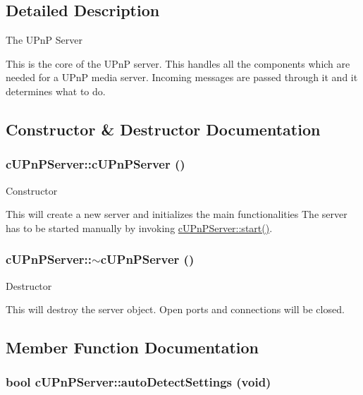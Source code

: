 \subsection{Detailed Description}
The UPnP Server

This is the core of the UPnP server. This handles all the components which are needed for a UPnP media server. Incoming messages are passed through it and it determines what to do. 

\subsection{Constructor \& Destructor Documentation}
\hypertarget{classcUPnPServer_e0277b2231f10e66a5c6ce9acb42fcd0}{
\subsubsection[{cUPnPServer}]{\setlength{\rightskip}{0pt plus 5cm}cUPnPServer::cUPnPServer ()}}
\label{classcUPnPServer_e0277b2231f10e66a5c6ce9acb42fcd0}


Constructor

This will create a new server and initializes the main functionalities The server has to be started manually by invoking \hyperlink{classcUPnPServer_811d90c5aadc75bc48670757def1c21e}{cUPnPServer::start()}. \hypertarget{classcUPnPServer_8eb136050f3f6c2edb7acbf5d690723d}{
\subsubsection[{$\sim$cUPnPServer}]{\setlength{\rightskip}{0pt plus 5cm}cUPnPServer::$\sim$cUPnPServer ()}}
\label{classcUPnPServer_8eb136050f3f6c2edb7acbf5d690723d}


Destructor

This will destroy the server object. Open ports and connections will be closed. 

\subsection{Member Function Documentation}
\hypertarget{classcUPnPServer_783f27c1997257539ccb8ff7ade815be}{
\subsubsection[{autoDetectSettings}]{\setlength{\rightskip}{0pt plus 5cm}bool cUPnPServer::autoDetectSettings (void)}}
\label{classcUPnPServer_783f27c1997257539ccb8ff7ade815be}


